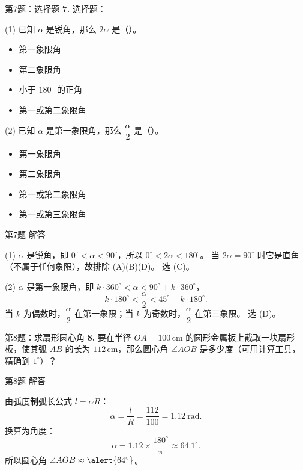 \documentclass[10pt,aspectratio=169,serif]{beamer}
\begin{document}
\begin{frame}[t]{第7题：选择题}
\textbf{7.} 选择题：

(1) 已知 $\alpha$ 是锐角，那么 $2\alpha$ 是（\quad）。
\begin{itemize}
  \item[(A)] 第一象限角
  \item[(B)] 第二象限角
  \item[(C)] 小于 $180^\circ$ 的正角
  \item[(D)] 第一或第二象限角
\end{itemize}

(2) 已知 $\alpha$ 是第一象限角，那么 $\dfrac{\alpha}{2}$ 是（\quad）。
\begin{itemize}
  \item[(A)] 第一象限角
  \item[(B)] 第二象限角
  \item[(C)] 第一或第二象限角
  \item[(D)] 第一或第三象限角
\end{itemize}
\end{frame}

\begin{frame}[t]{第7题 解答}
\begin{tcolorbox}[colback=orange!10,colframe=orange,title=\textbf{解}]
(1) $\alpha$ 是锐角，即 $0^\circ<\alpha<90^\circ$，所以 $0^\circ<2\alpha<180^\circ$。
当 $2\alpha=90^\circ$ 时它是直角（不属于任何象限），故排除 (A)(B)(D)。
选 \alert{(C)}。

\vspace{0.5em}
(2) $\alpha$ 是第一象限角，即 $k\cdot 360^\circ<\alpha<90^\circ+k\cdot 360^\circ$，
\[
k\cdot 180^\circ<\frac{\alpha}{2}<45^\circ+k\cdot 180^\circ.
\]
当 $k$ 为偶数时，$\dfrac{\alpha}{2}$ 在第一象限；当 $k$ 为奇数时，$\dfrac{\alpha}{2}$ 在第三象限。
选 \alert{(D)}。
\end{tcolorbox}
\end{frame}

\begin{frame}[t]{第8题：求扇形圆心角}
\textbf{8.} 要在半径 $OA=100\,\text{cm}$ 的圆形金属板上截取一块扇形板，使其弧 $AB$ 的长为 $112\,\text{cm}$，那么圆心角 $\angle AOB$ 是多少度（可用计算工具，精确到 $1^\circ$）？
\end{frame}

\begin{frame}[t]{第8题 解答}
\begin{tcolorbox}[colback=orange!10,colframe=orange,title=\textbf{解}]
由弧度制弧长公式 $l=\alpha R$：
\[
\alpha = \frac{l}{R} = \frac{112}{100} = 1.12\ \text{rad}.
\]
换算为角度：
\[
\alpha = 1.12\times\frac{180^\circ}{\pi}\approx 64.1^\circ.
\]
所以圆心角 $\angle AOB\approx\alert{64^\circ}$。
\end{tcolorbox}
\end{frame}
\end{document}
